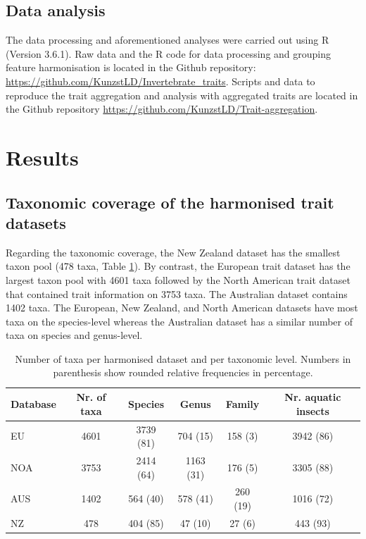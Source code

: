 \documentclass{article}
\begin{document}
\subsection*{Data analysis}

The data processing and aforementioned analyses were carried out using R (Version 3.6.1). Raw data and the R code for data processing and grouping feature harmonisation is located in the Github repository: \url{https://github.com/KunzstLD/Invertebrate_traits}. Scripts and data to reproduce the trait aggregation and analysis with aggregated traits are located in the Github repository \url{https://github.com/KunzstLD/Trait-aggregation}.


\section*{Results}

\subsection*{Taxonomic coverage of the harmonised trait datasets}

Regarding the taxonomic coverage, the New Zealand dataset has the smallest taxon pool (478 taxa, Table \ref{tab:tax_coverage}). By contrast, the European trait dataset has the largest taxon pool with 4601 taxa followed by the North American trait dataset that contained trait information on 3753 taxa. The Australian dataset contains 1402 taxa. The European, New Zealand, and North American datasets have most taxa on the species-level whereas the Australian dataset has a similar number of taxa on species and genus-level.

\begin{table}[ht]
    \centering
    \caption{Number of taxa per harmonised dataset and per taxonomic level. Numbers in parenthesis show rounded relative frequencies in percentage.} 
    \label{tab:tax_coverage}
    \begin{tabular}{lccccc}
    \toprule[.1em]
    Database & Nr. of taxa & Species & Genus & Family & Nr. aquatic insects \\ 
    \toprule[.1em]
    EU & 4601 & 3739 (81) & 704 (15) & 158 (3) & 3942 (86) \\ 
    NOA & 3753 & 2414 (64) & 1163 (31) & 176 (5) & 3305 (88) \\ 
    AUS & 1402 & 564 (40) & 578 (41) & 260 (19) & 1016 (72) \\ 
    NZ & 478 & 404 (85) & 47 (10) & 27 (6) & 443 (93) \\ 
    \bottomrule
    \end{tabular}
\end{table}
\end{document}
